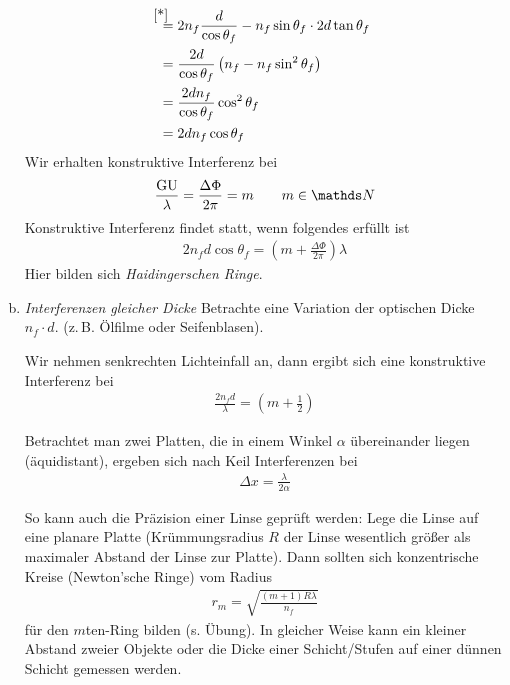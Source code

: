 \begin{enumerate}[a)]
\begin{align*}
        &\overset{\mathllap{\eqref{*}}}{=} 
          2 n_f\frac{d}{\cos\theta_f} - n_f\sin\theta_f \cdot 2d\tan\theta_f\\
        &= \frac{2d}{\cos\theta_f}\left( n_f-n_f\sin^2\theta_f\right)\\
        &= \frac{2dn_f}{\cos\theta_f}\cos^2\theta_f\\
        &= 2dn_f\cos\theta_f
  \end{align*}
  Wir erhalten konstruktive Interferenz bei
  \begin{gather*}
    \frac{\GU}{\lambda} = \frac{\Delta\Phi}{2\pi} = m 
    \qquad m\in\N
  \end{gather*}
  Konstruktive Interferenz findet statt, wenn folgendes erfüllt ist
  \begin{gather*}
    2n_f d\cos\theta_f = \left( m+\frac{\Delta\Phi}{2\pi} \right)\lambda
  \end{gather*}
  Hier bilden sich \emph{Haidingerschen Ringe}.

\item \emph{Interferenzen gleicher Dicke}
  Betrachte eine Variation der optischen Dicke $n_f\cdot d$.
  (z.\,B. Ölfilme oder Seifenblasen).

  Wir nehmen senkrechten Lichteinfall an, dann ergibt sich eine
  konstruktive Interferenz bei
  \begin{gather*}
    \frac{2 n_f d}{\lambda} = (m+\frac{1}{2})
  \end{gather*}

  Betrachtet man zwei Platten, die in einem Winkel $\alpha$ übereinander
  liegen (äquidistant), ergeben sich nach Keil Interferenzen bei
  \begin{gather*}
    \Delta x = \frac{\lambda}{2\alpha}
  \end{gather*}

  So kann auch die Präzision einer Linse geprüft werden: Lege die Linse
  auf eine planare Platte (Krümmungsradius $R$ der Linse wesentlich
  größer als maximaler Abstand der Linse zur Platte).
  Dann sollten sich konzentrische Kreise (Newton'sche Ringe) vom Radius
  \begin{gather*}
    r_m = \sqrt{\frac{(m+1)R\lambda}{n_f}}
  \end{gather*}
  für den $m$ten-Ring bilden (s. Übung).
  In gleicher Weise kann ein kleiner Abstand zweier Objekte oder die
  Dicke einer Schicht/Stufen auf einer dünnen Schicht gemessen werden.


\end{enumerate}
